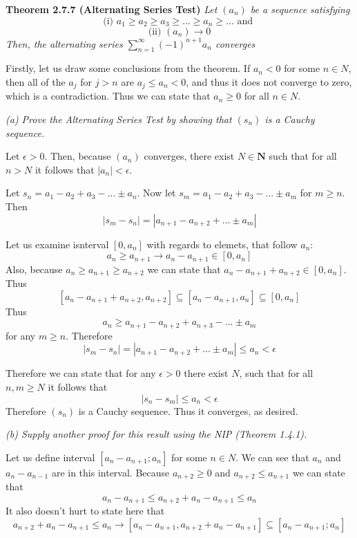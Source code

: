 \documentclass[11pt,oneside,titlepage]{book}
\begin{document}
\textbf{Theorem 2.7.7 (Alternating Series Test)}
\textit{Let $(a_n)$ be a sequence satisfying}
$$\text{(i) } a_1 \geq a_2 \geq a_3 \geq ... \geq a_n \geq ... \text{ and }$$
$$\text{(ii) } (a_n) \to 0$$
\textit{Then, the alternating series $\sum_{n = 1}^{\infty}(-1)^{n + 1} a_n$
converges}

Firstly, let us draw some conclusions from the theorem. If $a_n < 0$ for
some $n \in N$, then all of the $a_j$ for $j > n$ are $a_j \leq a_n < 0$, and
thus it does not converge to zero, which is a contradiction. Thus we
can state that $a_n \geq 0$ for all $n \in N$.

\textit{(a) Prove the Alternating Series Test by showing that $(s_n)$ is a
  Cauchy sequence.}


Let $\epsilon > 0$. Then, because $(a_n)$ converges, there exist
$N \in \textbf{N}$ such that for all $n > N$ it follows that
$|a_n| < \epsilon$.

Let $s_n = a_1 - a_2 + a_3 - ... \pm a_n$. Now let
$s_m = a_1 - a_2 + a_3 - ... \pm a_m$ for $m \geq n$. Then
$$|s_m - s_n| = |a_{n + 1} - a_{n + 2} + ... \pm a_m|$$

Let us examine isnterval $[0, a_n]$ with regards to elemets, that follow $a_n$:
$$a_n \geq a_{n + 1} \to a_n - a_{n + 1} \in [0, a_n]$$
Also, because $a_n \geq a_{n + 1} \geq a_{n + 2}$ we can state that
$a_n - a_{n + 1} + a_{n + 2} \in [0, a_n]$.  Thus
$$[a_n - a_{n + 1} + a_{n + 2}, a_{n + 2}] \subseteq
[a_n - a_{n + 1}, a_n] \subseteq [0, a_n]$$
Thus
$$ a_n \geq a_{n + 1} - a_{n + 2} + a_{n + 3} - ... \pm a_m$$
for any $m \geq n$.
Therefore
$$|s_m - s_n| = |a_{n + 1} - a_{n + 2} + ... \pm a_m| \leq a_n < \epsilon$$


Therefore we can state that for any $\epsilon > 0$ there exist $N$, such that for all
$n, m \geq N$ it follows that
$$|s_n - s_m| \leq a_n < \epsilon$$
Therefore $(s_n)$ is a Cauchy sequence. Thus it converges, as desired.

\textit{(b) Supply another proof for this result using the NIP (Theorem 1.4.1).
}

Let us define  interval $[a_n - a_{n + 1}; a_n]$ for some $n \in N$.
We can see that
$a_n$ and $a_n - a_{n - 1}$ are in this interval. Because
$a_{n + 2} \geq 0$ and  $a_{n + 2} \leq a_{n + 1}$ we can state that
$$a_n - a_{n + 1} \leq a_{n + 2} + a_n - a_{n + 1} \leq a_n$$
It also doesn't hurt to state here that
$$a_{n + 2} + a_n - a_{n + 1} \leq a_n \to [a_n - a_{n + 1}, a_{n + 2} + a_n - a_{n + 1}] \subseteq [a_n - a_{n + 1}; a_n]$$
\end{document}
